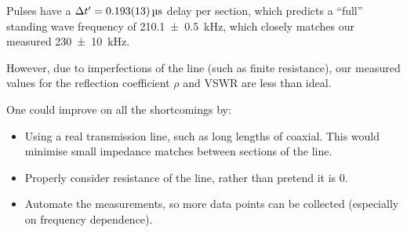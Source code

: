 \documentclass[a4paper]{scrartcl}
\begin{document}
Pulses have a \(\Delta t' = \SI{0.193 \pm 0.013}{\micro\second}\) delay per section, which predicts a ``full'' standing wave frequency of \SI{210.1 \pm 0.5}{\kilo\hertz}, which closely matches our measured \SI{230 \pm 10}{\kilo\hertz}.

However, due to imperfections of the line (such as finite resistance), our measured values for the reflection coefficient \(\rho\) and VSWR are less than ideal.

One could improve on all the shortcomings by:
\begin{itemize}
    \item Using a real transmission line, such as long lengths of coaxial. This would minimise small impedance matches between sections of the line.
    \item Properly consider resistance of the line, rather than pretend it is 0.
    \item Automate the measurements, so more data points can be collected (especially on frequency dependence).
\end{itemize}
\end{document}
